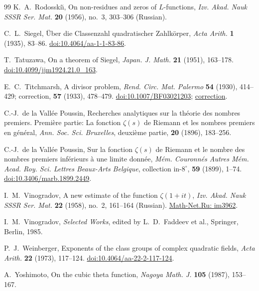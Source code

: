 \begin{thebibliography}{99}
K.~A.~Rodosski\u{\i},
On non-residues and zeros of $L$-functions,
\emph{Izv. Akad. Nauk SSSR Ser. Mat.} \textbf{20} (1956),
no.~3, 303--306 (Russian).

C.~L.~Siegel,
\"Uber die Classenzahl quadratischer Zahlk\"orper,
\emph{Acta Arith.} \textbf{1} (1935), 83--86.
\href{https://doi.org/10.4064/aa-1-1-83-86}
{doi:10.4064/aa-1-1-83-86}.

{\raggedright
T.~Tatuzawa,
On a theorem of Siegel,
\emph{Japan. J. Math.} \textbf{21} (1951), 163--178.
\href{https://doi.org/10.4099/jjm1924.21.0_163}
{doi:10.4099/jjm1924.21.0\_163}.
\par}

E.~C.~Titchmarsh,
A divisor problem,
\emph{Rend. Circ. Mat. Palermo} \textbf{54} (1930), 414--429;
correction, \textbf{57} (1933), 478--479.
\href{https://doi.org/10.1007/BF03021203}{doi:10.1007/BF03021203};
\href{https://doi.org/10.1007/BF03017588}{correction}.

C.-J.~de la Vall\'ee Poussin,
Recherches analytiques sur la th\'eorie des nombres premiers.
Premi\`ere partie: La fonction $\zeta(s)$ de Riemann et les
nombres premiers en g\'en\'eral,
\emph{Ann. Soc. Sci. Bruxelles}, deuxi\`eme partie,
\textbf{20} (1896), 183--256.

C.-J.~de la Vall\'ee Poussin,
Sur la fonction $\zeta(s)$ de Riemann et le nombre des nombres
premiers inf\'erieurs \`a une limite donn\'ee,
\emph{M\'em. Couronn\'es Autres M\'em. Acad. Roy. Sci.
Lettres Beaux-Arts Belgique}, collection in-$8^\circ$,
\textbf{59} (1899), 1--74.
\href{https://doi.org/10.3406/marb.1899.2449}
{doi:10.3406/marb.1899.2449}.

I.~M.~Vinogradov,
A new estimate of the function $\zeta(1+it)$,
\emph{Izv. Akad. Nauk SSSR Ser. Mat.} \textbf{22} (1958),
no.~2, 161--164 (Russian).
\href{https://www.mathnet.ru/eng/im3962}{Math-Net.Ru: im3962}.

I.~M.~Vinogradov,
\emph{Selected Works}, edited by L.~D.~Faddeev et al.,
Springer, Berlin, 1985.

P.~J.~Weinberger,
Exponents of the class groups of complex quadratic fields,
\emph{Acta Arith.} \textbf{22} (1973), 117--124.
\href{https://doi.org/10.4064/aa-22-2-117-124}{doi:10.4064/aa-22-2-117-124}.

A.~Yoshimoto,
On the cubic theta function,
\emph{Nagoya Math. J.} \textbf{105} (1987), 153--167.

\end{thebibliography}


